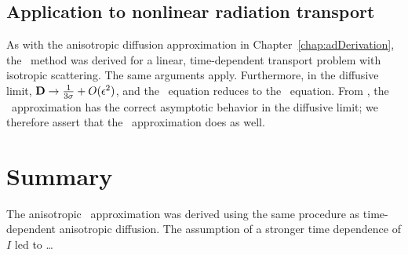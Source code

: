 \subsection{Application to nonlinear radiation transport}

As with the anisotropic diffusion approximation in
Chapter~\ref{chap:adDerivation}, the \APone\ method was derived for a linear,
time-dependent transport problem with isotropic scattering. The same arguments
apply. Furthermore, in the diffusive limit, $\mathbf{D} \to \frac{1}{3\sigma} +
O(\epsilon^2)$, and the \APone\ equation reduces to the \Pone\ equation. From
\cite{Mor2000}, the \Pone\ approximation has the correct asymptotic behavior in
the diffusive limit; we therefore assert that the \APone\ approximation does
as well. 


\section{Summary}
The anisotropic \Pone\ approximation was derived using the same procedure as 
time-dependent anisotropic diffusion. The assumption of a stronger time
dependence of $I$ led to \dots

